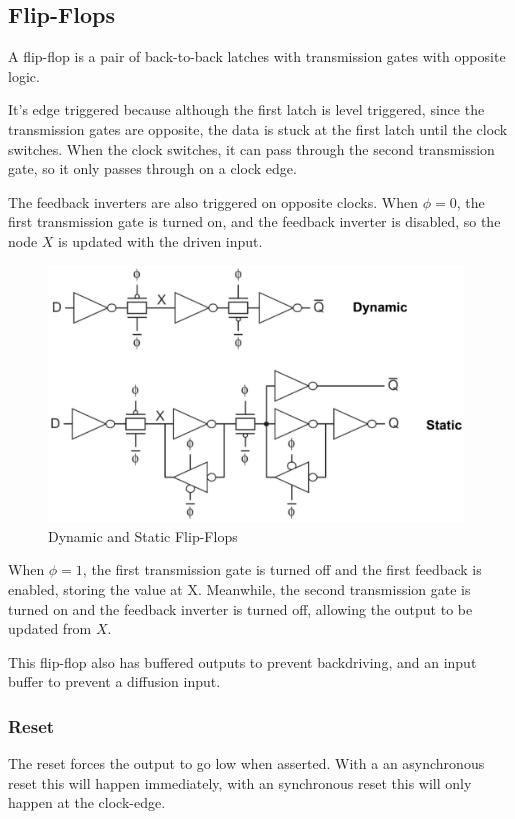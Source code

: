 \documentclass{article}
\begin{document}
\subsection{Flip-Flops}

A flip-flop is a pair of back-to-back latches with transmission gates with opposite logic. 

It's edge triggered because although the first latch is level triggered, since the transmission gates are opposite, the data is stuck at the first latch until the clock switches. When the clock switches, it can pass through the second transmission gate, so it only passes through on a clock edge. 

The feedback inverters are also triggered on opposite clocks. When $\phi=0$, the first transmission gate is turned on, and the feedback inverter is disabled, so the node $X$ is updated with the driven input. 


\begin{figure}[ht!]
\centering
\includegraphics[width=110mm]{FF.png}
\caption{Dynamic and Static Flip-Flops}
\label{C2MOS}
\end{figure}

When $\phi=1$, the first transmission gate is turned off and the first feedback is enabled, storing the value at X. Meanwhile, the second transmission gate is turned on and the feedback inverter is turned off, allowing the output to be updated from $X$. 

This flip-flop also has buffered outputs to prevent backdriving, and an input buffer to prevent a diffusion input.

\subsubsection{Reset}

The reset forces the output to go low when asserted. With a an asynchronous reset this will happen immediately, with an synchronous reset this will only happen at the clock-edge. 
\end{document}
